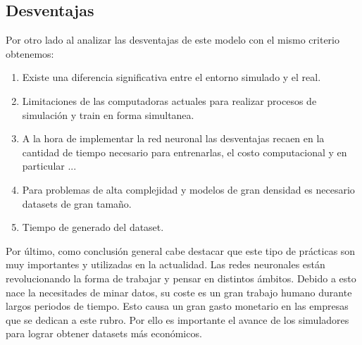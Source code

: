 \documentclass[]{IEEEtran}
\begin{document}
    \subsection{Desventajas}
    
    Por otro lado al analizar las desventajas de este modelo con el mismo criterio obtenemos:
    
    \begin{enumerate}
        \item Existe una diferencia significativa entre el entorno simulado y el real.
        \item Limitaciones de las computadoras actuales para realizar procesos de simulación y train en forma simultanea.
        \item A la hora de implementar la red neuronal las desventajas recaen en la cantidad de tiempo necesario para entrenarlas, el costo computacional 
        y en particular ... %
        \item Para problemas de alta complejidad y modelos de gran densidad es necesario datasets de gran tamaño.
        \item Tiempo de generado del dataset.
    \end{enumerate}


    Por último, como conclusión general cabe destacar que este tipo de prácticas son muy importantes y utilizadas en la actualidad. Las redes neuronales 
    están revolucionando la forma de trabajar y pensar en distintos ámbitos. Debido a esto nace la necesitades de minar datos, 
    su coste es un gran trabajo humano durante largos periodos de tiempo. Esto causa un gran gasto monetario en las empresas que se 
    dedican a este rubro. Por ello es importante el avance de los simuladores para lograr obtener datasets más económicos.


    
    
\end{document}
